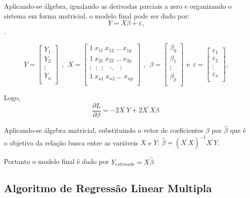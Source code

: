\documentclass[	12pt, Times, openright, twoside, a4paper, english, brazil]{abntex2}
\begin{document}
          Aplicando-se álgebra, igualando as derivadas parciais a zero e organizando o sistema em forma matricial, o modelo final pode ser dado por: $$\begin{equation*}Y=X\beta+\varepsilon,\end{equation*}$$.
          
          $$Y=\left[\begin{array}{c}Y_1\\Y_2\\\vdots\\Y_n\\\end{array} \right]~~,~~X=\left[\begin{array}{ccccc}1~x_{11}~ x_{12}~\ldots~x_{1p}\\1~x_{21}~x_{22}~\ldots~x_{2p}\\\vdots~~~\vdots~~~\vdots~~~\ddots~~~\vdots\\1~x_{n1}~x_{n2}~\ldots~x_{np}\\\end{array} \right]~~,~~\beta=\left[ \begin{array}{c}\beta_0\\\beta_1\\\vdots\\\beta_p\\\end{array} \right]~~\mbox{e}~~ \varepsilon=\left[ \begin{array}{c}\varepsilon_1\\\varepsilon_2\\\vdots\\\varepsilon_n\\\end{array}\right],$$
          
          Logo, $$\frac{\partial L}{\partial\beta}=-2X^\prime Y+2X^\prime X\beta.$$
          
          Aplicando-se álgebra matricial, substituindo o vetor de coeficientes $\beta$ por $\widehat\beta$ que é o objetivo da relação busca entre as variáveis $X$ e $Y$:
          $ \begin{equation*}\widehat{\beta}=(X^\prime X)^{-1} X^\prime Y.\end{equation*} $
          
          Portanto o modelo final é dado por $Y_{estimado} = X\widehat{\beta}$.
          
        \subsection{Algoritmo de Regressão Linear Multipla}
        
\end{document}
